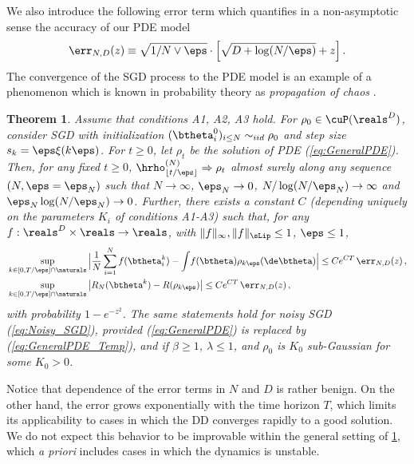 \documentclass[11pt]{article}
\newtheorem{theorem}{Theorem}
\renewcommand{\eqref}[1]{(\ref{#1})}
\begin{document}
We also introduce the following error term which quantifies in a non-asymptotic 
sense the accuracy of our PDE model 
%
\begin{align}
%
\err_{N,D}(z)\equiv \sqrt{1/N \vee \eps } \cdot \Big[\sqrt{D + \log (N  / \eps)} + z \Big]\, .
%
\end{align}
%
The convergence of the SGD process to the PDE model is an example of a phenomenon 
which is known in probability theory as \emph{propagation of chaos} \cite{sznitman1991topics}.
\begin{theorem}\label{thm:GeneralPDE}
Assume that conditions {\sf A1}, {\sf A2}, {\sf A3} hold.
For $\rho_0\in\cuP(\reals^D)$, consider SGD with initialization $(\btheta^0_i)_{i\le N}\sim_{iid}\rho_0$ and step size $s_k = \eps \xi(k \eps)$. For $t\ge 0$, let $\rho_t$ be the solution of PDE \eqref{eq:GeneralPDE}.
Then, for any fixed $t \ge 0$,  $\hrho^{(N)}_{\lfloor t / \eps \rfloor} \Rightarrow \rho_{t}$ almost surely along any sequence $(N,\eps = \eps_N)$ such that $N \to \infty$, $\eps_N \to 0$, $N/\log (N/\eps_N) \to\infty$ and $\eps_N \log(N / \eps_N)\to 0$.
Further, there exists a constant $C$  (depending uniquely on the parameters $K_i$ of conditions {\sf A1}-{\sf A3}) such that,
for any $f:\reals^D\times \reals\to\reals$, with $\|f\|_{\infty}, \|f\|_{\sLip}\le 1$, $\eps\le 1$,
%
\begin{align}
%
&\sup_{k \in  [0, T/\eps] \cap \naturals}\Big|\frac{1}{N}\sum_{i=1}^Nf(\btheta^{k}_i)- \int\!
  f(\btheta)  \rho_{k\eps}(\de \btheta) \Big| \le Ce^{CT}\,\err_{N,D}(z)\, ,\nonumber\\
&\sup_{k \in  [0, T/\eps] \cap \naturals}\big|R_{N}(\btheta^{k})-R(\rho_{k\eps})\big| \le Ce^{CT}\,\err_{N,D}(z)\, ,
%
\end{align} 
%
with probability $1- e^{-z^2}$.
The same statements hold for noisy SGD \eqref{eq:Noisy_SGD}, provided \eqref{eq:GeneralPDE} is replaced by \eqref{eq:GeneralPDE_Temp},
and if $\beta\ge 1$, $\lambda\le 1$, and $\rho_0$ is $K_0$ sub-Gaussian for some $K_0>0$.
\end{theorem}
%
Notice that dependence of the error terms in $N$ and $D$ is rather benign. On the other hand, the error grows exponentially with the  time horizon $T$,
which limits its applicability to cases in which the  DD converges rapidly to a good solution.
We do not expect this behavior to be improvable within the general setting of \ref{thm:GeneralPDE}, which \emph{a priori} includes cases in which the dynamics is unstable. 
\end{document}
